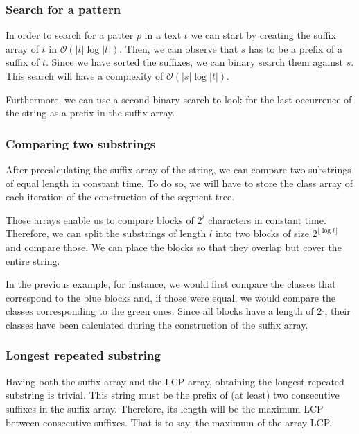 \subsubsection{Search for a pattern}
In order to search for a patter $p$ in a text $t$ we can start
by creating the
suffix array of $t$ in $\mathcal{O}(|t|\log |t|)$. 
Then, we can observe that $s$ has to be a prefix of a suffix of 
$t$. Since we have sorted the suffixes, we can binary search
them against $s$. This search will have a complexity of 
$\mathcal{O}(|s|\log |t|)$.

Furthermore, we can use a second binary search to look for the last
occurrence of the string as a prefix in the suffix array.

\subsubsection{Comparing two substrings}
After precalculating the suffix array of the string, we can compare
two substrings of equal length in constant time. To do so, we will
have to store the class array of each iteration of the construction
of the segment tree.

Those arrays enable us to compare blocks of $2^i$ characters in 
constant time. Therefore, we can split the substrings of length $l$
into two blocks of size $2^{\lfloor \log l \rfloor}$ and compare
those. We can place the blocks so that they overlap but cover 
the entire string. 
\begin{figure}[h!]
		\centering
		\label{fig:lcp_cmp}
\end{figure}

In the previous example, for instance, we would first compare the 
classes that correspond to the blue blocks and, if those were equal,
we would compare the classes corresponding to the green ones. Since 
all blocks have a length of $2^\_$, their classes have been calculated
during the construction of the suffix array.

\subsubsection{Longest repeated substring}
Having both the suffix array and the LCP array, obtaining the longest
repeated substring is trivial.
This string must be the prefix of (at least) two consecutive suffixes
in the suffix array. Therefore, its length will be the maximum LCP
between consecutive suffixes. That is to say, the maximum of the 
array LCP.

